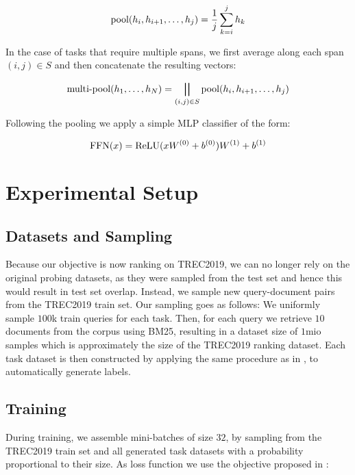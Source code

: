 \begin{equation}
    \text{pool}(h_i, h_{i+1},\dots, h_j)= \frac{1}{j} \sum_{k=i}^j h_k
\end{equation}

In the case of tasks that require multiple spans, we first average along each span $(i,j) \in S$ and then concatenate the resulting vectors:

\begin{equation}
    \text{multi-pool}(h_1, \dots, h_N) = \bigparallel_{(i, j) \in S}{\text{pool}(h_i, h_{i+1},\dots, h_j)}
\end{equation}

Following the pooling we apply a simple MLP classifier of the form:

\begin{equation}
    \text{FFN}(x) = \text{ReLU}(x W^{(0)} + b^{(0)}) W^{(1)} + b^{(1)}
\end{equation}


\section{Experimental Setup}
\subsection{Datasets and Sampling}
Because our objective is now ranking on TREC2019, we can no longer rely on the original probing datasets, as they were sampled from the test set and hence this would result in test set overlap. Instead, we sample new query-document pairs from the TREC2019 train set. Our sampling goes as follows: We uniformly sample $100$k train queries for each task. Then, for each query we retrieve $10$ documents from the corpus using BM25, resulting in a dataset size of $1$mio samples which is approximately the size of the TREC2019 ranking dataset. Each task dataset is then constructed by applying the same procedure as in , to automatically generate labels.

\subsection{Training}
During training, we assemble mini-batches of size $32$, by sampling from the TREC2019 train set and all generated task datasets with a probability proportional to their size. As loss function we use the objective proposed in \cite{aghajanyan-etal-2021-muppet}:

